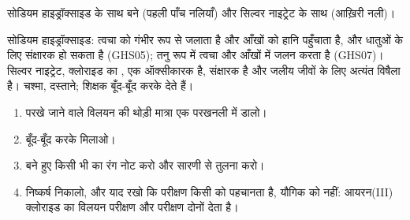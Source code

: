 \begin{omfigure}

{\small सोडियम हाइड्रॉक्साइड के साथ बने  (पहली पाँच नलियाँ) और
सिल्वर नाइट्रेट के साथ (आख़िरी नली)।}
\end{omfigure}

\begin{safety}{}
सोडियम हाइड्रॉक्साइड: त्वचा को गंभीर रूप से जलाता है और आँखों को हानि पहुँचाता
है, और धातुओं के लिए संक्षारक हो सकता है (GHS05); तनु रूप में त्वचा और आँखों में
जलन करता है (GHS07)। सिल्वर नाइट्रेट, क्लोराइड का
, एक ऑक्सीकारक है, संक्षारक है और जलीय जीवों के लिए अत्यंत विषैला है।
चश्मा, दस्ताने;  शिक्षक बूँद-बूँद करके देते हैं।
\end{safety}

\begin{method}[किसी आयन का परीक्षण]\label{met:g9:ions:test}
\begin{enumerate}
  \item परखे जाने वाले विलयन की थोड़ी मात्रा एक परखनली में डालो।
  \item {} बूँद-बूँद करके मिलाओ।
  \item बने हुए किसी भी  का रंग नोट करो और सारणी से तुलना करो।
  \item निष्कर्ष निकालो, और याद रखो कि परीक्षण किसी  को पहचानता है, यौगिक
        को नहीं: आयरन(III) क्लोराइड का विलयन
         परीक्षण और  परीक्षण दोनों देता है।
\end{enumerate}
\end{method}

